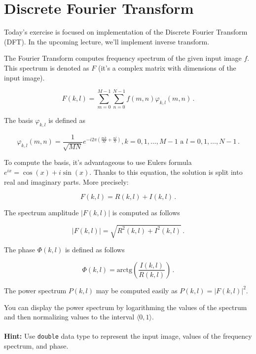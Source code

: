 \documentclass[12pt]{article}
\begin{document}
\section*{Discrete Fourier Transform}

\noindent
Today's exercise is focused on implementation of the Discrete Fourier Transform (DFT).
In the upcoming lecture, we'll implement inverse transform.

\noindent
The Fourier Transform computes frequency spectrum of the given input image $f$.
This spectrum is denoted as $F$ (it's a complex matrix with dimensions of the input image).

\begin{equation}
    F(k, l) = \sum\limits_{m=0}^{M-1} \sum\limits_{n=0}^{N-1} f(m, n) \varphi_{k, l}(m, n)\,.
\end{equation}

\noindent
The basis $\varphi_{k, l}$ is defined as

\begin{equation}
    \varphi_{k, l}(m, n) = \frac{1}{\sqrt{MN}} e^{-i 2 \pi \left( \frac{mk}{M} + \frac{nl}{N} \right) }, k = 0, 1, \dots, M-1 \,\, \mathrm{a} \,\, l = 0, 1, \dots, N-1\,.
\end{equation}

\noindent
To compute the basis, it's advantageous to use Eulers formula $e^{ix} = \cos( x ) + i \sin( x )$.
Thanks to this equation, the solution is split into real and imaginary parts. More precisely:

\begin{equation}
    F(k, l) = R(k, l) + I(k, l)\, .
\end{equation}

\noindent
The spectrum amplitude $|F(k, l)|$ is computed as follows

\begin{equation}
    |F(k, l)| = \sqrt{ R^2(k, l) + I^2(k, l)}\, .
\end{equation}

\noindent
The phase $\Phi(k, l)$ is defined as follows

\begin{equation}
    \Phi(k, l) = \mathrm{arctg}\left( \frac{I(k, l)}{R(k, l)} \right)\, .
\end{equation}

\noindent
The power spectrum $P(k, l)$ may be computed easily as $ P(k, l) = |F(k, l)|^2$.

\noindent
You can display the power spectrum by logarithming the values of the spectrum and then normalizing values to the interval $\langle 0, 1\rangle$.
%
%
\\
\\
\noindent
\textbf{Hint:} Use \texttt{double} data type to represent the input image, values of the frequency spectrum, and phase.
\end{document}
